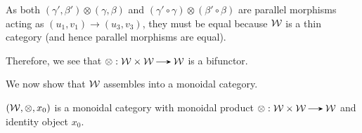 \begin{prf}
\begin{center}
    \end{center}
    As both $(\gamma', \beta')\otimes(\gamma, \beta)$ and $(\gamma' \circ \gamma)\otimes (\beta' \circ \beta)$
    are parallel morphisms acting as $(u_1,v_1) \to (u_3,  v_3)$, they must be equal 
    because $\mathcal{W}$ is a thin category (and hence parallel morphisms are equal).

    Therefore, we see that $\otimes: \ww \times \ww \to \ww$ is a bifunctor.
\end{prf}

We now show that $\mathcal{W}$ assembles into a monoidal category. 
\begin{proposition}
    $(\mathcal{W}, \otimes, x_0)$ is a monoidal category
    with monoidal product $\otimes: \ww \times \ww \to \ww$   
    and identity object $x_0$.
\end{proposition}

